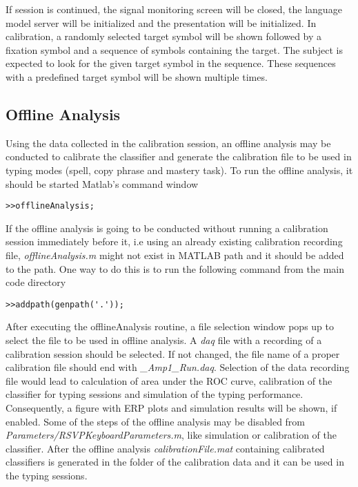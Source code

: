 \documentclass[12pt,letterpaper]{report}
\begin{document}
If session is continued, the signal monitoring screen will be closed, the language model server will be initialized and the presentation will be initialized. In calibration, a randomly selected target symbol will be shown followed by a fixation symbol and a sequence of symbols containing the target. The subject is expected to look for the given target symbol in the sequence. These sequences with a predefined target symbol will be shown multiple times.
\subsection{Offline Analysis}
Using the data collected in the calibration session, an offline analysis may be conducted to calibrate the classifier and generate the calibration  file to be used in typing modes (spell, copy phrase and mastery task). To run the offline analysis, it should be started Matlab's command window
\begin{verbatim}
>>offlineAnalysis;
\end{verbatim}
If the offline analysis is going to be conducted without running a calibration session immediately before it, i.e using an already existing calibration recording file, \textit{offlineAnalysis.m} might not exist in MATLAB path and it should be added to the path. One way to do this is to run the following command from the main code directory
\begin{verbatim}
>>addpath(genpath('.'));
\end{verbatim}

After executing the offlineAnalysis routine, a file selection window pops up to select the file to be used in offline analysis. A \textit{daq} file with a recording of a calibration session should be selected. If not changed, the file name of a proper calibration file should end with \textit{\_Amp1\_Run.daq}. Selection of the data recording file would lead to calculation of area under the ROC curve, calibration of the classifier for typing sessions and simulation of the typing performance. Consequently, a figure with ERP plots and simulation results will be shown, if enabled. Some of the steps of the offline analysis may be disabled from \textit{Parameters/RSVPKeyboardParameters.m}, like simulation or calibration of the classifier. After the offline analysis \textit{calibrationFile.mat} containing calibrated classifiers is generated in the folder of the calibration data and it can be used in the typing sessions.
 
\end{document}
